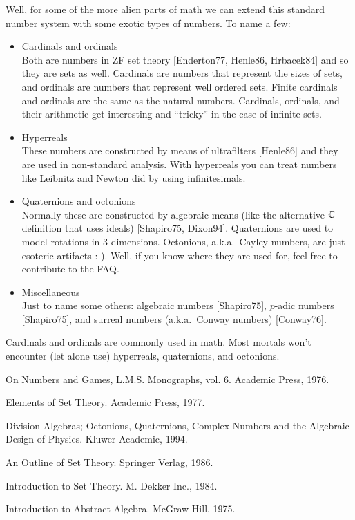 Well, for some of the more alien parts of math we can extend this
standard number system with some exotic types of numbers. To name a few:
\begin{itemize}
  \item Cardinals and ordinals \\
      Both are numbers in ZF set theory [Enderton77, Henle86, Hrbacek84] and
      so they are sets as well. Cardinals are numbers that represent the
      sizes of sets, and ordinals are numbers that represent well ordered
      sets. Finite cardinals and ordinals are the same as the natural
      numbers. Cardinals, ordinals, and their arithmetic get interesting and
      ``tricky'' in the case of infinite sets.
  \item Hyperreals \\
      These numbers are constructed by means of ultrafilters [Henle86] and
      they are used in non-standard analysis. With hyperreals you can treat
      numbers like Leibnitz and Newton did by using infinitesimals.
  \item Quaternions and octonions \\
      Normally these are constructed by algebraic means (like the alternative
      $\mathbb C$ definition that uses ideals) [Shapiro75, Dixon94]. Quaternions are
      used to model rotations in 3 dimensions. Octonions, a.k.a.\ Cayley
      numbers, are just esoteric artifacts :-). Well, if you know where they
      are used for, feel free to contribute to the FAQ.
  \item Miscellaneous \\
      Just to name some others: algebraic numbers [Shapiro75], $p$-adic
      numbers [Shapiro75], and surreal numbers (a.k.a.\ Conway
      numbers) [Conway76].
\end{itemize}
Cardinals and ordinals are commonly used in math. Most mortals won't
encounter (let alone use) hyperreals, quaternions, and octonions.

\Ref

     {On Numbers and Games, L.M.S. Monographs, vol. 6.}
     {Academic Press, 1976.}

     {Elements of Set Theory.}
     {Academic Press, 1977.}

     {Division Algebras; Octonions, Quaternions, Complex Numbers and the
     Algebraic Design of Physics.}
     {Kluwer Academic, 1994.}

     {An Outline of Set Theory.}
     {Springer Verlag, 1986.}

     {Introduction to Set Theory.}
     {M. Dekker Inc., 1984.}

     {Introduction to Abstract Algebra.}
     {McGraw-Hill, 1975.}

